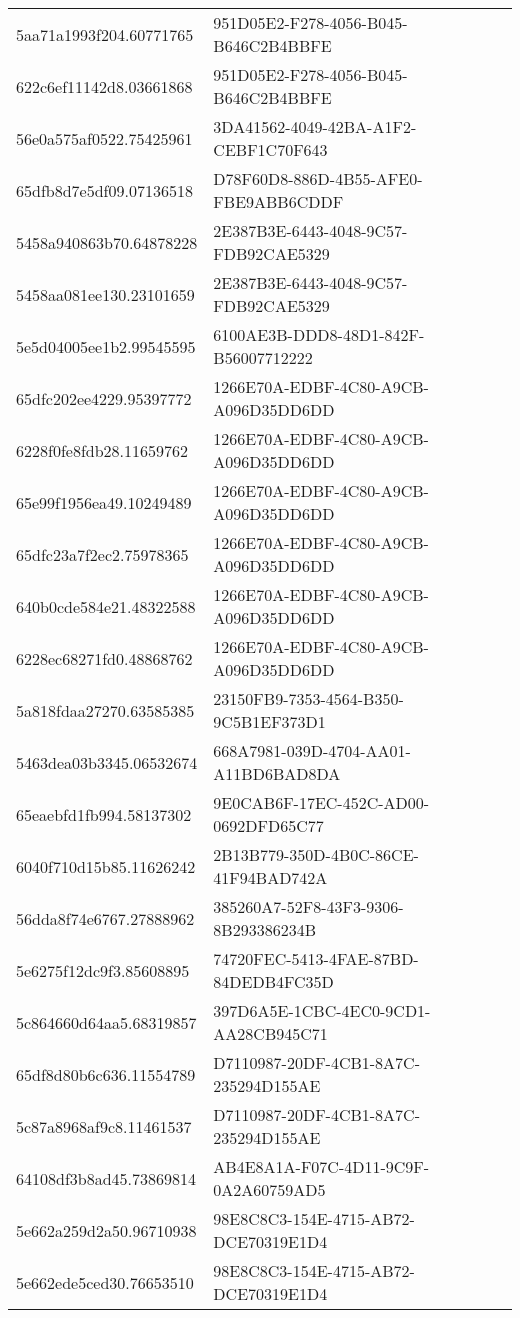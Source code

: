 \begin{tabular}{ll}
5aa71a1993f204.60771765 & 951D05E2-F278-4056-B045-B646C2B4BBFE \\
622c6ef11142d8.03661868 & 951D05E2-F278-4056-B045-B646C2B4BBFE \\
56e0a575af0522.75425961 & 3DA41562-4049-42BA-A1F2-CEBF1C70F643 \\
65dfb8d7e5df09.07136518 & D78F60D8-886D-4B55-AFE0-FBE9ABB6CDDF \\
5458a940863b70.64878228 & 2E387B3E-6443-4048-9C57-FDB92CAE5329 \\
5458aa081ee130.23101659 & 2E387B3E-6443-4048-9C57-FDB92CAE5329 \\
5e5d04005ee1b2.99545595 & 6100AE3B-DDD8-48D1-842F-B56007712222 \\
65dfc202ee4229.95397772 & 1266E70A-EDBF-4C80-A9CB-A096D35DD6DD \\
6228f0fe8fdb28.11659762 & 1266E70A-EDBF-4C80-A9CB-A096D35DD6DD \\
65e99f1956ea49.10249489 & 1266E70A-EDBF-4C80-A9CB-A096D35DD6DD \\
65dfc23a7f2ec2.75978365 & 1266E70A-EDBF-4C80-A9CB-A096D35DD6DD \\
640b0cde584e21.48322588 & 1266E70A-EDBF-4C80-A9CB-A096D35DD6DD \\
6228ec68271fd0.48868762 & 1266E70A-EDBF-4C80-A9CB-A096D35DD6DD \\
5a818fdaa27270.63585385 & 23150FB9-7353-4564-B350-9C5B1EF373D1 \\
5463dea03b3345.06532674 & 668A7981-039D-4704-AA01-A11BD6BAD8DA \\
65eaebfd1fb994.58137302 & 9E0CAB6F-17EC-452C-AD00-0692DFD65C77 \\
6040f710d15b85.11626242 & 2B13B779-350D-4B0C-86CE-41F94BAD742A \\
56dda8f74e6767.27888962 & 385260A7-52F8-43F3-9306-8B293386234B \\
5e6275f12dc9f3.85608895 & 74720FEC-5413-4FAE-87BD-84DEDB4FC35D \\
5c864660d64aa5.68319857 & 397D6A5E-1CBC-4EC0-9CD1-AA28CB945C71 \\
65df8d80b6c636.11554789 & D7110987-20DF-4CB1-8A7C-235294D155AE \\
5c87a8968af9c8.11461537 & D7110987-20DF-4CB1-8A7C-235294D155AE \\
64108df3b8ad45.73869814 & AB4E8A1A-F07C-4D11-9C9F-0A2A60759AD5 \\
5e662a259d2a50.96710938 & 98E8C8C3-154E-4715-AB72-DCE70319E1D4 \\
5e662ede5ced30.76653510 & 98E8C8C3-154E-4715-AB72-DCE70319E1D4 \\

\end{tabular}
